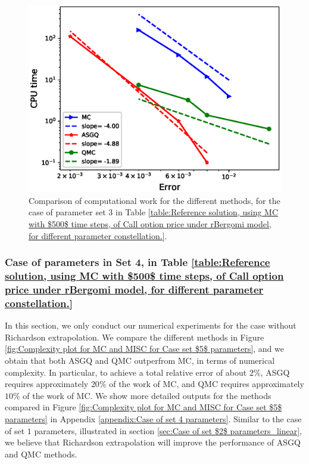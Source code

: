 \FloatBarrier

\begin{figure}[h!]
	\centering
	\includegraphics[width=0.5\linewidth]{./figures/rBergomi_Complexity_rates/set6/error_vs_time_set6_full_comparison}
	
	\caption{Comparison of computational work for the different  methods, for the case of parameter set $3$ in Table \ref{table:Reference solution, using MC with $500$ time steps, of Call option price under rBergomi model, for different parameter constellation.}.}
	\label{fig:Complexity plot for MC and MISC for case set $4$ parameters}
\end{figure}
\FloatBarrier

\subsubsection{Case of parameters in Set 4, in Table \ref{table:Reference solution, using MC with $500$ time steps, of Call option price under rBergomi model, for different parameter constellation.} }\label{sec:Case of set 5 parameters}

In this section, we only conduct our numerical experiments for the case without Richardson extrapolation.  We compare the different methods  in Figure \ref{fig:Complexity plot for MC and MISC for Case set $5$ parameters}, and we obtain that both ASGQ and QMC outperfrom MC, in terms of numerical complexity. In particular,  to achieve a total relative error of about $2\%$, ASGQ  requires	approximately $20\%$ of the work of MC, and  QMC requires approximately $10\%$ of the work of MC. We show more detailed outputs for the methods compared in Figure \ref{fig:Complexity plot for MC and MISC for Case set $5$ parameters} in Appendix \ref{appendix:Case of set 4 parameters}.   Similar to the case of set $1$ parameters, illustrated in section \ref{sec:Case of set $2$ parameters_linear}, we believe that Richardson extrapolation will improve the performance of ASGQ and QMC methods.   

